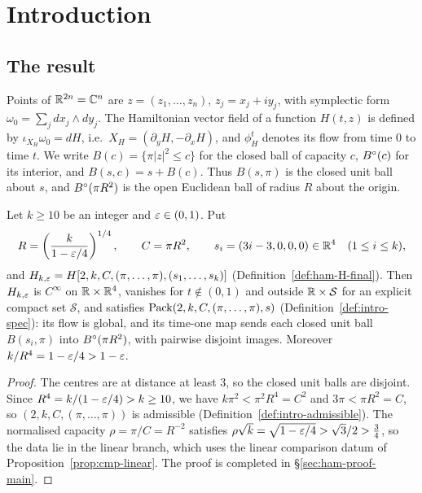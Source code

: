 \section{Introduction}\label{sec:intro}

\subsection{The result}\label{sec:intro-problem}

Points of $\mathbb{R}^{2n}=\mathbb{C}^n$ are $z=(z_1,\dots,z_n)$, $z_j=x_j+iy_j$, with symplectic form
$\omega_0=\sum_jdx_j\wedge dy_j$. The Hamiltonian vector field of a function $H(t,z)$ is defined by
$\iota_{X_H}\omega_0=dH$, i.e.\ $X_H=(\partial_{y}H,-\partial_{x}H)$, and $\phi^t_H$ denotes its flow from time $0$ to
time $t$. We write $B(c)=\{\pi|z|^2\le c\}$ for the closed ball of capacity $c$, $B^{\circ}(c)$ for its interior, and
$B(s,c)=s+B(c)$. Thus $B(s,\pi)$ is the closed unit ball about $s$, and $B^{\circ}(\pi R^2)$ is the open Euclidean ball of
radius $R$ about the origin.

\begin{maintheorem}\label{thm:intro-4d}
Let $k\ge10$ be an integer and $\varepsilon\in(0,1)$. Put
\[
 R=\left(\frac{k}{1-\varepsilon/4}\right)^{1/4},\qquad C=\pi R^2,\qquad s_i=(3i-3,0,0,0)\in\mathbb{R}^4\quad(1\le i\le k),
\]
and $H_{k,\varepsilon}=H[2,k,C,(\pi,\dots,\pi),(s_1,\dots,s_k)]$ (Definition~\ref{def:ham-H-final}). Then $H_{k,\varepsilon}$ is
$C^\infty$ on $\mathbb{R}\times\mathbb{R}^4$, vanishes for $t\notin(0,1)$ and outside $\mathbb{R}\times\mathcal S$ for an explicit compact set
$\mathcal S$, and satisfies $\mathrm{Pack}(2,k,C,(\pi,\dots,\pi),s)$ (Definition~\ref{def:intro-spec}): its flow is global, and
its time-one map sends each closed unit ball $B(s_i,\pi)$ into $B^{\circ}(\pi R^2)$, with pairwise disjoint images. Moreover
$k/R^4=1-\varepsilon/4>1-\varepsilon$.
\end{maintheorem}

\begin{proof}
The centres are at distance at least $3$, so the closed unit balls are disjoint. Since $R^4=k/(1-\varepsilon/4)>k\ge10$, we
have $k\pi^2<\pi^2R^4=C^2$ and $3\pi<\pi R^2=C$, so $(2,k,C,(\pi,\dots,\pi))$ is admissible
(Definition~\ref{def:intro-admissible}). The normalised capacity $\rho=\pi/C=R^{-2}$ satisfies
$\rho\sqrt k=\sqrt{1-\varepsilon/4}>\sqrt3/2>\frac34$, so the data lie in the linear branch, which uses the linear
comparison datum of Proposition~\ref{prop:cmp-linear}. The proof is completed in \S\ref{sec:ham-proof-main}.
\end{proof}

